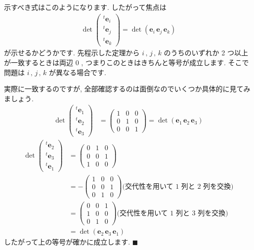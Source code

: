 \documentclass[openany, a4paper, oneside]{jsbook}
\theoremstyle{break}
\theoremstyle{breakdefn}
\begin{document}
示すべき式はこのようになります. したがって焦点は
    \begin{align}
        \det \begin{pmatrix} ^{t}\bm{e}_{i} \\ ^{t}\bm{e}_{j} \\ ^{t}\bm{e}_{k} \end{pmatrix}
        =
        \det \left ( \bm{e}_{i} \, \bm{e}_{j} \, \bm{e}_{k} \right)
    \end{align}
が示せるかどうかです. 先程示した定理から $i\, , \,j \, , \, k$ のうちのいずれか 2 つ以上が一致するときは両辺 $0$ ,
つまりこのときはきちんと等号が成立します.
そこで問題は $i\, , \,j \, , \, k$ が異なる場合です.

実際に一致するのですが, 全部確認するのは面倒なのでいくつか具体的に見てみましょう.
    \begin{align}
        \det \begin{pmatrix} ^{t}\bm{e}_{1} \\ ^{t}\bm{e}_{2} \\ ^{t}\bm{e}_{3} \end{pmatrix}
        &= \begin{pmatrix} 1 & 0 & 0 \\
                          0 & 1 & 0 \\
                          0 & 0 & 1
          \end{pmatrix}
        =
        \det \left ( \bm{e}_{1} \, \bm{e}_{2} \, \bm{e}_{3} \right)
    \end{align}
    \begin{align}
        \det \begin{pmatrix} ^{t}\bm{e}_{2} \\ ^{t}\bm{e}_{3} \\ ^{t}\bm{e}_{1} \end{pmatrix}
        &= \begin{pmatrix} 0 & 1 & 0 \\
                          0 & 0 & 1 \\
                          1 & 0 & 0
          \end{pmatrix} \\
        &= - \begin{pmatrix} 1 & 0 & 0 \\
                            0 & 0 & 1 \\
                            0 & 1 & 0
          \end{pmatrix} \text{(交代性を用いて 1 列と 2 列を交換)} \\
        &= \begin{pmatrix} 0 & 0 & 1 \\
                          1 & 0 & 0 \\
                          0 & 1 & 0
          \end{pmatrix} \text{(交代性を用いて 1 列と 3 列を交換)} \\
        &=
        \det \left ( \bm{e}_{2} \, \bm{e}_{3} \, \bm{e}_{1} \right)
    \end{align}
したがって上の等号が確かに成立します.  $\blacksquare$
\end{document}
